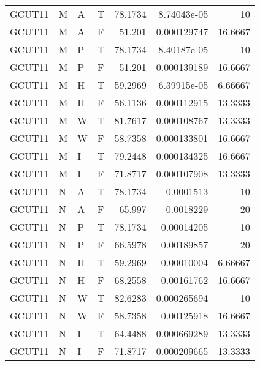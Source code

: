 \begin{tabular}{llllrrr}
    GCUT11   & M     & A     & T          & 78.1734    & 8.74043e-05 & 10       \\
    GCUT11   & M     & A     & F          & 51.201     & 0.000129747 & 16.6667  \\
    GCUT11   & M     & P     & T          & 78.1734    & 8.40187e-05 & 10       \\
    GCUT11   & M     & P     & F          & 51.201     & 0.000139189 & 16.6667  \\
    GCUT11   & M     & H     & T          & 59.2969    & 6.39915e-05 & 6.66667  \\
    GCUT11   & M     & H     & F          & 56.1136    & 0.000112915 & 13.3333  \\
    GCUT11   & M     & W     & T          & 81.7617    & 0.000108767 & 13.3333  \\
    GCUT11   & M     & W     & F          & 58.7358    & 0.000133801 & 16.6667  \\
    GCUT11   & M     & I     & T          & 79.2448    & 0.000134325 & 16.6667  \\
    GCUT11   & M     & I     & F          & 71.8717    & 0.000107908 & 13.3333  \\
    GCUT11   & N     & A     & T          & 78.1734    & 0.0001513   & 10       \\
    GCUT11   & N     & A     & F          & 65.997     & 0.0018229   & 20       \\
    GCUT11   & N     & P     & T          & 78.1734    & 0.00014205  & 10       \\
    GCUT11   & N     & P     & F          & 66.5978    & 0.00189857  & 20       \\
    GCUT11   & N     & H     & T          & 59.2969    & 0.00010004  & 6.66667  \\
    GCUT11   & N     & H     & F          & 68.2558    & 0.00161762  & 16.6667  \\
    GCUT11   & N     & W     & T          & 82.6283    & 0.000265694 & 10       \\
    GCUT11   & N     & W     & F          & 58.7358    & 0.00125918  & 16.6667  \\
    GCUT11   & N     & I     & T          & 64.4488    & 0.000669289 & 13.3333  \\
    GCUT11   & N     & I     & F          & 71.8717    & 0.000209665 & 13.3333  \\
    \hline
\end{tabular}